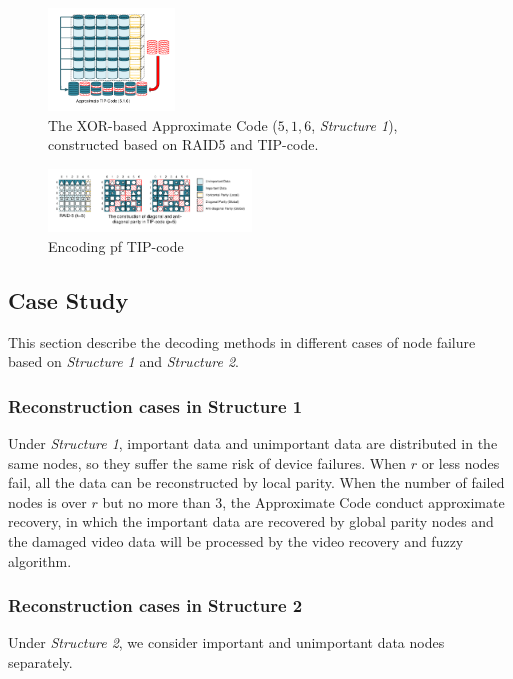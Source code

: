 \documentclass[sigconf]{acmart}
\begin{document}
\begin{figure}[]
\centering
\includegraphics[width=0.3\textwidth]{photo/AP-516.pdf}
\caption{The XOR-based Approximate Code ($5,1,6$, \emph{Structure 1}), constructed based on RAID5 and TIP-code.}
\label{fig-ap-TIP}
\end{figure}

\begin{figure}[]

    \includegraphics[width=0.48\textwidth]{photo/RAID5-TIP.pdf}

\caption{Encoding pf TIP-code}
\label{fig-TIP}
\end{figure}

\iffalse
\subsection{Case Study}
This section describe the decoding methods in different cases of node failure based on \emph{Structure 1} and \emph{Structure 2}.

\subsubsection{Reconstruction cases in Structure 1}
Under \emph{Structure 1}, important data and unimportant data are distributed in the same nodes, so they suffer the same risk of device failures. 
When $r$ or less nodes fail, all the data can be reconstructed by local parity.
When the number of failed nodes is over $r$ but no more than 3, the Approximate Code conduct approximate recovery, in which the important data are recovered by global parity nodes and the damaged video data will be processed by the video recovery and fuzzy algorithm.

\subsubsection{Reconstruction cases in Structure 2}
Under \emph{Structure 2}, we consider important and unimportant data nodes separately.
\end{document}
